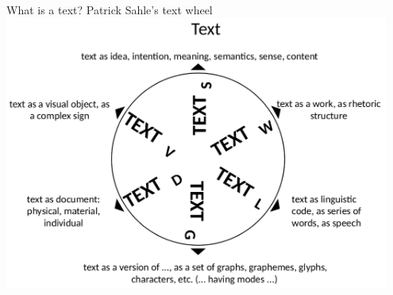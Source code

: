 \begin{frame}{What is a text?}
    Patrick Sahle's text wheel
    \includegraphics[width=0.95\textwidth]{img/sahle-text-wheel.png}
\end{frame}

